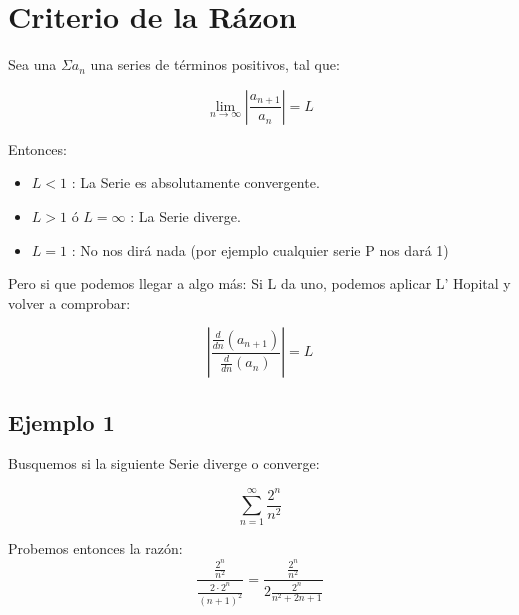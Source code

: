 \documentclass[12pt]{report}                                %
\begin{document}
    \section{Criterio de la Rázon}

        Sea una $\Sigma a_n$ una series de términos positivos, tal que:

        \begin{equation}
            \lim_{n \to \infty} \left| \frac{a_{n+1}}{a_n} \right| = L
        \end{equation}

        Entonces:
        \begin{itemize}
            \item $L < 1$ : La Serie es absolutamente convergente.
            \item $L > 1$ ó $L = \infty$ : La Serie diverge.
            \item $L = 1$ : No nos dirá nada (por ejemplo cualquier serie P nos dará 1)
        \end{itemize}

        Pero si que podemos llegar a algo más:
        Si L da uno, podemos aplicar L' Hopital y volver a comprobar:

        \begin{equation}
        \left| \frac{\frac{d}{dn} (a_{n+1})}{\frac{d}{dn} (a_n)} \right| = L
        \end{equation}



        \subsection{Ejemplo 1}
        Busquemos si la siguiente Serie diverge o converge:

        \begin{equation*}
            \sum_{n=1}^{\infty} \frac{2^n}{n^2}
        \end{equation*}

        Probemos entonces la razón:
        \begin{equation*}
            \frac{ \frac{2^n}{n^2} }{ \frac{2 \cdot 2^n}{(n+1)^2 } } = \frac{ \frac{2^n}{n^2} }{ 2 \frac{2^n}{n^2 + 2n + 1} }
        \end{equation*}



    \clearpage
\end{document}
